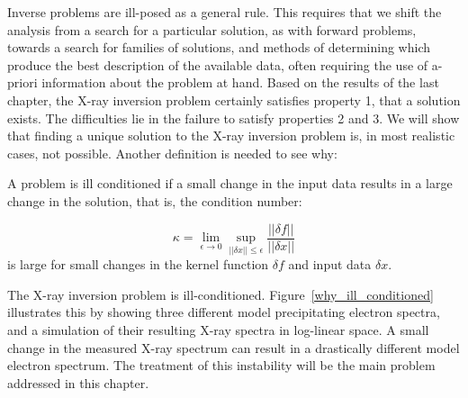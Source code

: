 Inverse problems are ill-posed as a general rule. This requires that we shift the analysis from a search for a particular solution, as with forward problems, towards a search for families of solutions, and methods of determining which produce the best description of the available data, often requiring the use of a-priori information about the problem at hand. Based on the results of the last chapter, the X-ray inversion problem certainly satisfies property 1, that a solution exists. The difficulties lie in the failure to satisfy properties 2 and 3. We will show that finding a unique solution to the X-ray inversion problem is, in most realistic cases, not possible. Another definition is needed to see why:

\begin{definition}
A problem is ill conditioned if a small change in the input data results in a large change in the solution, that is, the condition number:

$$\kappa = \lim_{\epsilon \to 0} \sup_{\vert\vert \delta x \vert \vert \leq \epsilon} \frac{\vert\vert \delta f \vert\vert}{\vert\vert \delta x \vert\vert}$$
is large for small changes in the kernel function $\delta f$ and input data $\delta x$.
\end{definition}

 The X-ray inversion problem is ill-conditioned. Figure~\ref{why_ill_conditioned} illustrates this by showing three different model precipitating electron spectra, and a simulation of their resulting X-ray spectra in log-linear space. A small change in the measured X-ray spectrum can result in a drastically different model electron spectrum. The treatment of this instability will be the main problem addressed in this chapter. 

